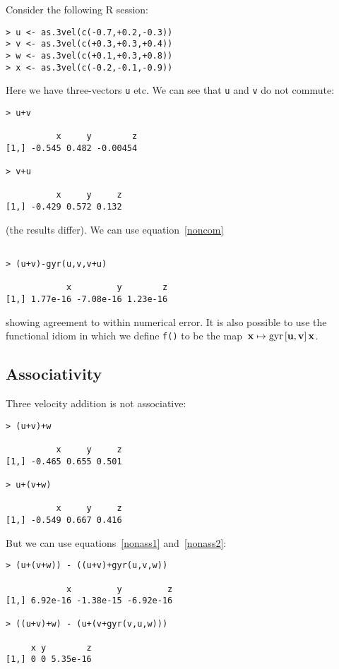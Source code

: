 \documentclass[ijoc,nonblindrev]{informs3} %
\begin{document}
Consider the following R session:

\begin{verbatim}
> u <- as.3vel(c(-0.7,+0.2,-0.3))
> v <- as.3vel(c(+0.3,+0.3,+0.4))
> w <- as.3vel(c(+0.1,+0.3,+0.8))
> x <- as.3vel(c(-0.2,-0.1,-0.9))

\end{verbatim}

Here we have three-vectors {\tt u} etc.  We can see that {\tt u} and
{\tt v} do not commute:

\begin{verbatim}
> u+v

          x     y        z
[1,] -0.545 0.482 -0.00454

> v+u

          x     y     z
[1,] -0.429 0.572 0.132

\end{verbatim}

(the results differ).  We can use equation~\ref{noncom}

\begin{verbatim}

> (u+v)-gyr(u,v,v+u)

            x         y        z 
[1,] 1.77e-16 -7.08e-16 1.23e-16

\end{verbatim}

showing agreement to within numerical error.  It is also possible to
use the functional idiom in which we define {\tt f()} to be the
map~$\mathbf x\mapsto\operatorname{gyr}\left[{\mathbf u},{\mathbf v}\right]\mathbf x$.

\subsection{Associativity}

Three velocity addition is not associative:

\begin{verbatim}
> (u+v)+w

          x     y     z
[1,] -0.465 0.655 0.501

> u+(v+w)

          x     y     z 
[1,] -0.549 0.667 0.416

\end{verbatim}

But we can use equations~\ref{nonass1} and~\ref{nonass2}:

\begin{verbatim}
> (u+(v+w)) - ((u+v)+gyr(u,v,w))

            x         y         z
[1,] 6.92e-16 -1.38e-15 -6.92e-16

> ((u+v)+w) - (u+(v+gyr(v,u,w)))

     x y        z
[1,] 0 0 5.35e-16

\end{verbatim}
\end{document}
